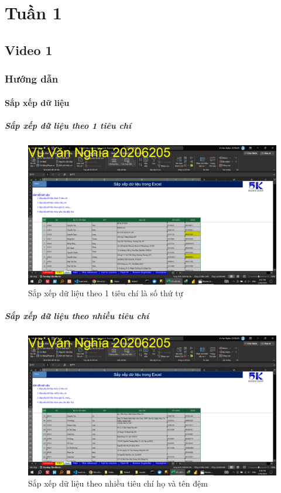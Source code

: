 \documentclass{article}
\begin{document}
\section{Tuần 1}



\subsection{Video 1}

\subsubsection{Hướng dẫn}
\paragraph{Sắp xếp dữ liệu}

\subparagraph{Sắp xếp dữ liệu theo 1 tiêu chí}
\begin{figure}[h]
    \centering
    \includegraphics[scale = 0.15]{Video1/HuongDan/1.png}
    \caption{Sắp xếp dữ liệu theo 1 tiêu chí là số thứ tự}
\end{figure}

\subparagraph{Sắp xếp dữ liệu theo nhiều tiêu chí}
\begin{figure}[h]
    \centering
    \includegraphics[scale = 0.15]{Video1/HuongDan/2.png}
    \caption{Sắp xếp dữ liệu theo  nhiều tiêu chí họ và tên đệm}
\end{figure}
\end{document}
